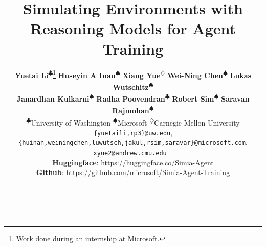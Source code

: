 \documentclass[11pt]{article}
\title{Simulating Environments with Reasoning Models for Agent Training}
\author{
\textbf{Yuetai Li}\textsuperscript{$\clubsuit$}\thanks{Work done during an internship at Microsoft.} \;\;\;  
\textbf{Huseyin A Inan}\textsuperscript{$\spadesuit$} \;\;\; 
\textbf{Xiang Yue}\textsuperscript{$\diamondsuit$} \;\;\; 
\textbf{Wei-Ning Chen}\textsuperscript{$\spadesuit$} \;\;\; 
\textbf{Lukas Wutschitz}\textsuperscript{$\spadesuit$} \;\;\; \\
\textbf{Janardhan Kulkarni}\textsuperscript{$\spadesuit$} \;\;\; 
\textbf{Radha Poovendran}\textsuperscript{$\clubsuit$}
\textbf{Robert Sim}\textsuperscript{$\spadesuit$} \;\;\; 
\textbf{Saravan Rajmohan}\textsuperscript{$\spadesuit$} \;\;\; \\
  \textsuperscript{$\clubsuit$}University of Washington \; 
  \textsuperscript{$\spadesuit$}Microsoft \;
  \textsuperscript{$\diamondsuit$}Carnegie Mellon University \; \\
  \texttt{\{yuetaili,rp3\}@uw.edu},\\
  \texttt{\{huinan,weiningchen,luwutsch,jakul,rsim,saravar\}@microsoft.com},\\
  \texttt{xyue2@andrew.cmu.edu}
  ~ \\
   \textbf{Huggingface}: \url{https://huggingface.co/Simia-Agent} \\ 
   \textbf{Github}: \url{https://github.com/microsoft/Simia-Agent-Training} \\
   ~ \\
   ~ \\
}
\begin{document}
\maketitle


\begin{abstract}

\end{abstract}














\clearpage
\appendix


\end{document}
